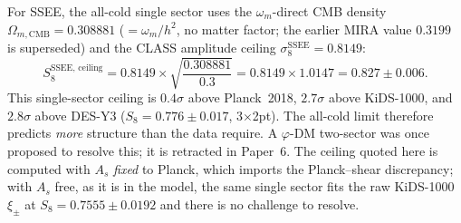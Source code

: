 \documentclass[12pt,a4paper]{article}
\begin{document}
For SSEE, the all-cold single sector uses the $\omega_m$-direct CMB density
$\Omega_{m,\mathrm{CMB}} = 0.308881$ ($=\omega_m/h^2$, no matter factor; the
earlier MIRA value $0.3199$ is superseded) and the CLASS amplitude ceiling
$\sigma_8^{\mathrm{SSEE}} = 0.8149$:
\begin{equation}
  \boxed{S_8^{\mathrm{SSEE,\,ceiling}}
    = 0.8149 \times \sqrt{\frac{0.308881}{0.3}}
    = 0.8149 \times 1.0147
    = 0.827 \pm 0.006.}
  \label{eq:S8_SSEE}
\end{equation}
This single-sector ceiling is $0.4\sigma$ above Planck~2018, $2.7\sigma$ above
KiDS-1000, and $2.8\sigma$ above DES-Y3 ($S_8 = 0.776\pm0.017$, 3$\times$2pt).
The all-cold limit therefore predicts \emph{more} structure than the data
require. A $\varphi$-DM two-sector was once proposed to resolve this; it is
retracted in Paper~6. The ceiling quoted here is computed with $A_s$
\emph{fixed} to Planck, which imports the Planck--shear discrepancy; with
$A_s$ free, as it is in the model, the same single sector fits the raw
KiDS-1000 $\xi_\pm$ at $S_8=0.7555\pm0.0192$ and there is no challenge to
resolve.
\end{document}
